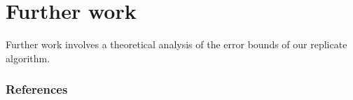 \documentclass{article} %
\begin{document}
\newpage
\section{Further work}
Further work involves a theoretical analysis of the error bounds of our replicate algorithm. 

\newpage
\subsubsection*{References}
\begingroup
\renewcommand{\section}[2]{}%


\endgroup
\end{document}
